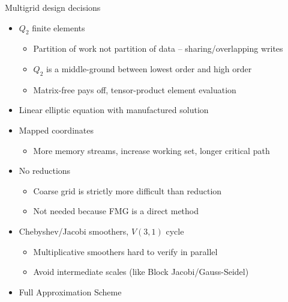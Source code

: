 \documentclass{beamer}
\begin{document}
\begin{frame}{Multigrid design decisions}
  \begin{itemize}
  \item $Q_2$ finite elements
    \begin{itemize}
    \item Partition of work not partition of data -- sharing/overlapping writes
    \item $Q_2$ is a middle-ground between lowest order and high order
    \item Matrix-free pays off, tensor-product element evaluation
    \end{itemize}
  \item Linear elliptic equation with manufactured solution
  \item Mapped coordinates
    \begin{itemize}
    \item More memory streams, increase working set, longer critical path
    \end{itemize}
  \item No reductions
    \begin{itemize}
    \item Coarse grid is strictly more difficult than reduction
    \item Not needed because FMG is a direct method
    \end{itemize}
  \item Chebyshev/Jacobi smoothers, $V(3,1)$ cycle
    \begin{itemize}
    \item Multiplicative smoothers hard to verify in parallel
    \item Avoid intermediate scales (like Block Jacobi/Gauss-Seidel)
    \end{itemize}
  \item Full Approximation Scheme
  \end{itemize}
\end{frame}
\end{document}
